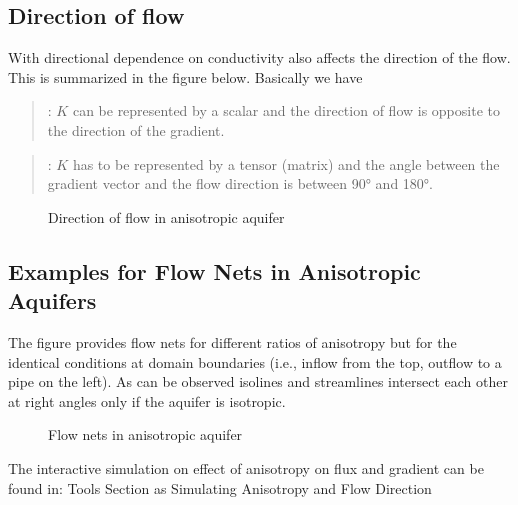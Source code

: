 \documentclass[letterpaper,10pt,english]{jupyterBook}
\begin{document}
\subsection{Direction of flow}
\label{\detokenize{content/flow/L6/16_darcy_law_3D:direction-of-flow}}
\sphinxAtStartPar
With directional dependence on conductivity also affects the direction of the flow. This is summarized in the figure below. Basically we have
\begin{quote}

\sphinxAtStartPar
{}: \(K\) can be represented by a scalar and the direction of flow is opposite to the direction of the gradient.
\end{quote}
\begin{quote}

\sphinxAtStartPar
{}: \(K\) has to be represented by a tensor (matrix) and the angle between the gradient vector and the flow direction is between 90° and 180°.
\end{quote}

\begin{figure}[htbp]
\centering
\capstart

\noindent{}
\caption{Direction of flow in anisotropic aquifer}\label{\detokenize{content/flow/L6/16_darcy_law_3D:aniso-dir}}\end{figure}


\subsection{Examples for Flow Nets in Anisotropic Aquifers}
\label{\detokenize{content/flow/L6/16_darcy_law_3D:examples-for-flow-nets-in-anisotropic-aquifers}}
\sphinxAtStartPar
The figure provides flow nets for different ratios of anisotropy but for the identical conditions at domain boundaries (i.e., inflow from the top, outflow to a pipe on the left). As can be observed isolines and streamlines intersect each other at right angles only if the aquifer is isotropic.

\begin{figure}[htbp]
\centering
\capstart

\noindent{}
\caption{Flow nets in anisotropic aquifer}\label{\detokenize{content/flow/L6/16_darcy_law_3D:flow-net-aniso}}\end{figure}

\sphinxAtStartPar
The interactive simulation on effect of anisotropy on flux and gradient can be found in:
Tools Section as Simulating Anisotropy and Flow Direction
\end{document}
